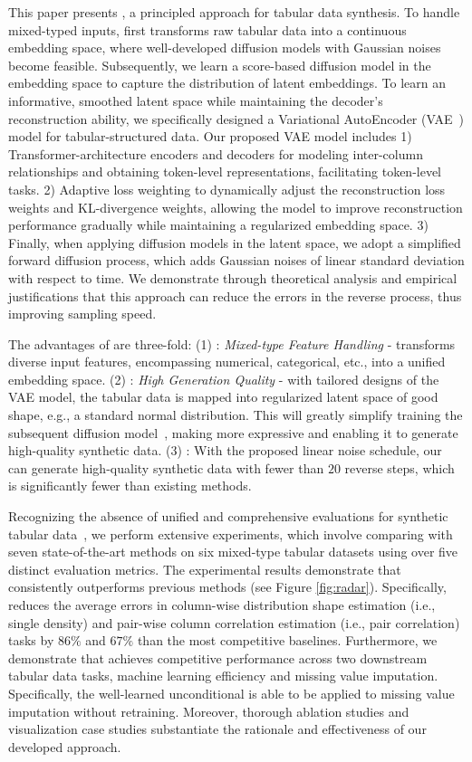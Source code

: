 This paper presents \emph{\modelname{}}, a principled approach for tabular data synthesis. To handle mixed-typed inputs, \modelname first transforms raw tabular data into a continuous embedding space, where well-developed diffusion models with Gaussian noises become feasible. Subsequently, we learn a score-based diffusion model in the embedding space to capture the distribution of latent embeddings. To learn an informative, smoothed latent space while maintaining the decoder's reconstruction ability, we specifically designed a Variational AutoEncoder (VAE~\citep{vae}) model for tabular-structured data. Our proposed VAE model includes 1) Transformer-architecture encoders and decoders for modeling inter-column relationships and obtaining token-level representations, facilitating token-level tasks. 2) Adaptive loss weighting to dynamically adjust the reconstruction loss weights and KL-divergence weights, allowing the model to improve reconstruction performance gradually while maintaining a regularized embedding space. 3) Finally, when applying diffusion models in the latent space, we adopt a simplified forward diffusion process, which adds Gaussian noises of linear standard deviation with respect to time. We demonstrate through theoretical analysis and empirical justifications that this approach can reduce the errors in the reverse process, thus improving sampling speed. 

The advantages of \modelname are three-fold: 
(1) \generality: \textit{Mixed-type Feature Handling} - \modelname transforms diverse input features, encompassing numerical, categorical, etc., into a unified embedding space.
(2) \quality: \textit{High Generation Quality} - with tailored designs of the VAE model, the tabular data is mapped into regularized latent space of good shape, e.g., a standard normal distribution. This will greatly simplify training the subsequent diffusion model~\citep{sgm}, making \modelname more expressive and enabling it to generate high-quality synthetic data. 
(3) \speed: 
With the proposed linear noise schedule, our \modelname can generate high-quality synthetic data with fewer than $20$ reverse steps, which is significantly fewer than existing methods.

Recognizing the absence of unified and comprehensive evaluations for synthetic tabular data~\citep{assess}, we perform extensive experiments, which involve comparing \modelname with seven state-of-the-art methods on six mixed-type tabular datasets using over five distinct evaluation metrics.
The experimental results demonstrate that \modelname consistently outperforms previous methods (see Figure \ref{fig:radar}). Specifically, \modelname reduces the average errors in column-wise distribution shape estimation (i.e., single density) and pair-wise column correlation estimation (i.e., pair correlation) tasks by $86\%$ and $67\%$ than the most competitive baselines. Furthermore, we demonstrate that \modelname achieves competitive performance across two downstream tabular data tasks, machine learning efficiency and missing value imputation. Specifically, the well-learned unconditional \modelname is able to be applied to missing value imputation without retraining. Moreover, thorough ablation studies and visualization case studies substantiate the rationale and effectiveness of our developed approach.
